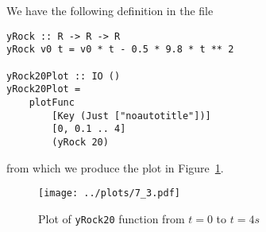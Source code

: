 
We have the following definition in the file 
\scriptsize\begin{verbatim}
yRock :: R -> R -> R
yRock v0 t = v0 * t - 0.5 * 9.8 * t ** 2

yRock20Plot :: IO ()
yRock20Plot =
    plotFunc
        [Key (Just ["noautotitle"])]
        [0, 0.1 .. 4]
        (yRock 20)
\end{verbatim}\normalsize
from which we produce the plot in Figure~\ref{fig7_3}.

\begin{figure}[!ht]
    \texttt{[image: ../plots/7\_3.pdf]}
    \caption{Plot of \texttt{yRock20} function from $t = 0$ to $t = 4s$ \label{fig7_3}} 
\end{figure}
